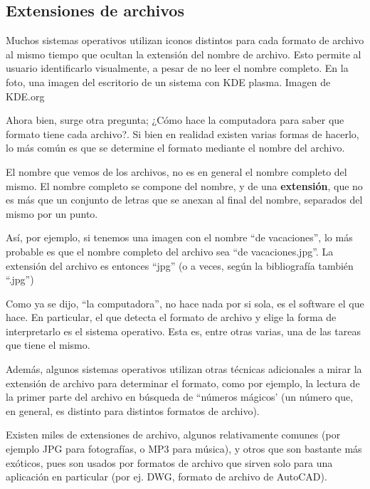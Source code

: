 \subsection{Extensiones de archivos}

{Muchos sistemas operativos utilizan iconos distintos para cada formato de
archivo al mismo tiempo que ocultan la extensión del nombre de archivo. Esto
permite al usuario identificarlo visualmente, a pesar de no leer el nombre
completo. En la foto, una imagen del escritorio de un sistema con KDE plasma.}
{Imagen de KDE.org}

Ahora bien, surge otra pregunta; ¿Cómo hace la computadora para saber que
formato tiene cada archivo?. Si bien en realidad existen varias formas de hacerlo,
lo más común es que se determine el formato mediante el nombre del archivo.

El nombre que vemos de los archivos, no es en general el nombre completo del
mismo. El nombre completo se compone del nombre, y de una \textbf{extensión},
que no es más que un conjunto de letras que se anexan al final del nombre,
separados del mismo por un punto.\autocite{linfo_2018}

Así, por ejemplo, si tenemos una imagen con el nombre ``de vacaciones'',
lo más probable es que el nombre completo del archivo sea ``de vacaciones.jpg''.
La extensión del archivo es entonces ``jpg'' (o a veces, según la bibliografía
también ``.jpg'')

\begin{knowwhat}[En realidad]
Como ya se dijo, ``la computadora'', no hace nada por si sola, es el software el
que hace. En particular, el que detecta el formato de archivo y elige la forma
de interpretarlo es el sistema operativo. Esta es, entre otras varias, una de
las tareas que tiene el mismo.

Además, algunos sistemas operativos utilizan otras técnicas adicionales a mirar
la extensión de archivo para determinar el formato, como por ejemplo, la lectura
de la primer parte del archivo en búsqueda de ``números mágicos' (un número que,
en general, es distinto para distintos formatos de archivo).
\end{knowwhat}

Existen miles de extensiones de archivo, algunos relativamente comunes (por
ejemplo JPG para fotografías, o MP3 para música), y otros que son bastante más
exóticos, pues son usados por formatos de archivo que sirven solo para una
aplicación en particular (por ej. DWG, formato de archivo de AutoCAD).

